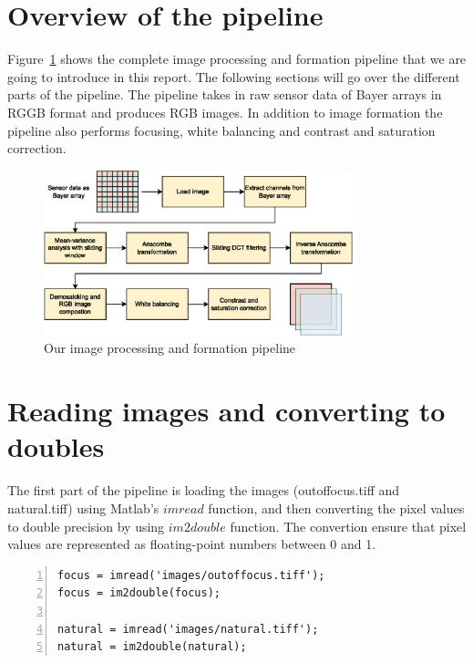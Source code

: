 \documentclass[12pt,a4paper,english
]{tunithesis}
\begin{document}
\section{Overview of the pipeline}
Figure~\ref{fig:pipeline} shows the complete image processing and formation pipeline that we are going to introduce in this report. The following sections will go over the different parts of the pipeline. The pipeline takes in raw sensor data of Bayer arrays in RGGB format and produces RGB images. In addition to image formation the pipeline also performs focusing, white balancing and contrast and saturation correction.

\begin{figure}
  \centering
  \includegraphics[width=0.8\textwidth]{img/image_pipeline.eps}
  \caption{Our image processing and formation pipeline}
  \label{fig:pipeline}
\end{figure}

\section{Reading images and converting to doubles}
The first part of the pipeline is loading the images (outoffocus.tiff and natural.tiff) using Matlab's $imread$ function, and then converting the pixel values to double precision by using $im2double$ function. The convertion ensure that pixel values are represented as floating-point numbers between 0 and 1. 
\begin{lstlisting}[style=Matlab-editor, numbers=left, basicstyle=\small]
% 1. Load image and convert to double
focus = imread('images/outoffocus.tiff');
focus = im2double(focus);

natural = imread('images/natural.tiff');
natural = im2double(natural);
\end{lstlisting}
\end{document}
